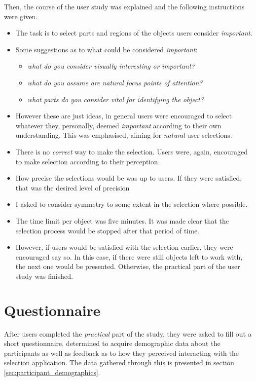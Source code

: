 Then, the course of the user study was explained and the following instructions were given.
\begin{itemize}
	\item The task is to select parts and regions of the objects users consider \textit{important}.
	\item Some suggestions as to what could be considered \textit{important}:
		\begin{itemize}
			\item \textit{what do you consider visually interesting or important?}
			\item \textit{what do you assume are natural focus points of attention?}
			\item \textit{what parts do you consider vital for identifying the object?}
		\end{itemize}
	\item However these are just ideas, in general users were encouraged to select whatever they, personally, deemed \textit{important} according to their own understanding. This was emphasised, aiming for \textit{natural} user selections.
	\item There is no \textit{correct} way to make the selection. Users were, again, encouraged to make selection according to their perception.
	\item How precise the selections would be was up to users. If they were satisfied, that was the desired level of precision
	\item I asked to consider symmetry to some extent in the selection where possible.
	\item The time limit per object was five minutes. It was made clear that the selection process would be stopped after that period of time.
	\item However, if users would be satisfied with the selection earlier, they were encouraged say so. In this case, if there were still objects left to work with, the next one would be presented. Otherwise, the practical part of the user study was finished.
\end{itemize}

	\section{Questionnaire}
	\label{sec:questionnaire}
After users completed the \textit{practical} part of the study, they were asked to fill out a short questionnaire, determined to acquire demographic data about the participants as well as feedback as to how they perceived interacting with the selection application. The data gathered through this is presented in section \ref{sec:participant_demographics}. 

